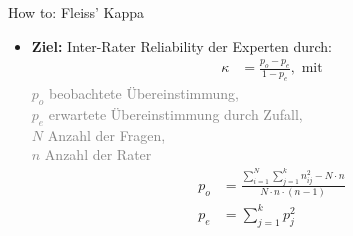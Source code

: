 \documentclass[usenames, dvipsnames, aspectratio=32]{beamer}
\begin{document}
\begin{frame}{How to: Fleiss' Kappa}
    \begin{itemize}
        \item \textbf{Ziel:} Inter-Rater Reliability der Experten durch:
        \begin{align*}
            \kappa &= \frac{p_o - p_e}{1 - p_e}, \text{ mit}
        \end{align*}
        \textcolor{gray}{$p_o$ beobachtete Übereinstimmung, \\ $p_e$ erwartete Übereinstimmung durch Zufall, \\
        $N$ Anzahl der Fragen, \\
        $n$ Anzahl der Rater}
        \begin{align*}
            p_o &= \frac{\sum_{i=1}^{N}\sum_{j=1}^{k} n_{ij}^2-N\cdot n}{N\cdot n\cdot (n-1)} \\
            p_e &= \sum_{j=1}^{k} p_j^2
        \end{align*}
    \end{itemize}
\end{frame}
\end{document}

